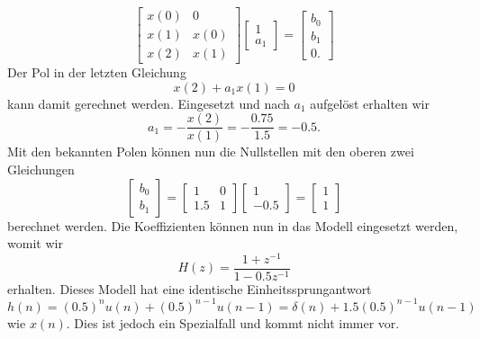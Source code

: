 \begin{beispiel}
\begin{equation}\left[\begin{array}{ll}
x(0) & 0 \\
x(1) & x(0) \\
x(2) & x(1)
\end{array}\right]\left[\begin{array}{c}
1 \\
a_1
\end{array}\right]=\left[\begin{array}{c}
b_0 \\
b_1\\
0.
\end{array}\right]\end{equation}
Der Pol in der letzten Gleichung 
\begin{equation}
x(2)+a_1 x(1)=0
\end{equation}
kann damit gerechnet werden.
Eingesetzt und nach $a_1$ aufgelöst erhalten wir
\begin{equation}
a_1=-\frac{x(2)}{x(1)}=
-\frac{0.75}{1.5}=
-0.5.
\end{equation}
Mit den bekannten Polen können nun die Nullstellen mit den oberen zwei Gleichungen 
\begin{equation}\left[\begin{array}{c}
b_0 \\
b_1
\end{array}\right]=\left[\begin{array}{cc}
1 & 0 \\
1.5 & 1
\end{array}\right]\left[\begin{array}{c}
1 \\
-0.5
\end{array}\right]=\left[\begin{array}{l}
1 \\
1
\end{array}\right]\end{equation}
berechnet werden.
Die Koeffizienten können nun in das Modell eingesetzt werden, womit wir
\begin{equation}
H(z)=\frac{1+z^{-1}}{1-0.5 z^{-1}}
\end{equation}
erhalten.
Dieses Modell hat eine identische Einheitssprungantwort 
\begin{equation}
h(n)=(0.5)^{n} u(n)+(0.5)^{n-1} u(n-1)
=
\delta(n)+1.5(0.5)^{n-1} u(n-1)\end{equation}
wie $x(n)$.
Dies ist jedoch ein Spezialfall und kommt nicht immer vor.
\end{beispiel}






